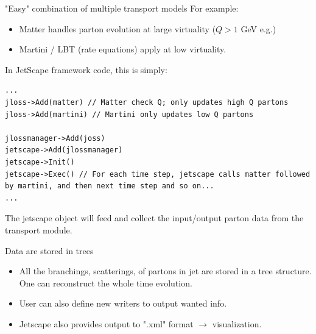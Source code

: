 \documentclass[11pt]{beamer}
\begin{document}
\begin{frame}[fragile]{"Easy" combination of multiple transport models}
For example:
\begin{itemize}
\item Matter handles parton evolution at large virtuality ($Q > 1$ GeV e.g.)
\item Martini / LBT (rate equations) apply at low virtuality.
\end{itemize}
In JetScape framework code, this is simply:
\begin{lstlisting}
...
jloss->Add(matter) // Matter check Q; only updates high Q partons
jloss->Add(martini) // Martini only updates low Q partons

jlossmanager->Add(joss)
jetscape->Add(jlossmanager)
jetscape->Init()
jetscape->Exec() // For each time step, jetscape calls matter followed by martini, and then next time step and so on...
...
\end{lstlisting}
The jetscape object will feed and collect the input/output parton data from the transport module. 
\end{frame}

\begin{frame}{Data are stored in trees}
\begin{itemize}
\item All the branchings, scatterings, of partons in jet are stored in a tree structure. One can reconstruct the whole time evolution.
\item User can also define new writers to output wanted info.
\item Jetscape also provides output to ".xml" format $\rightarrow$ visualization.\\
\end{itemize}

\end{frame}
\end{document}
